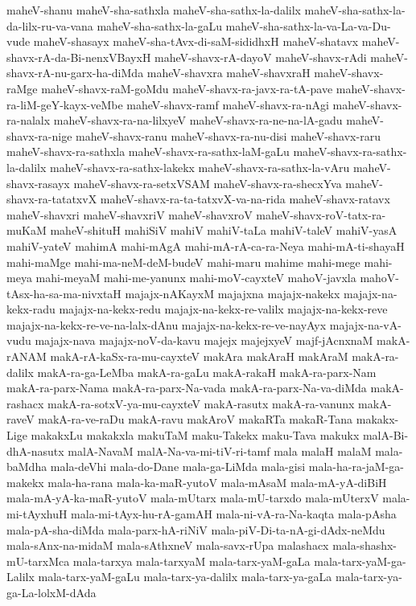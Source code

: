 {maheV-shanu
maheV-sha-sathxla
maheV-sha-sathx-la-dalilx
maheV-sha-sathx-la-da-lilx-ru-va-vana
maheV-sha-sathx-la-gaLu
maheV-sha-sathx-la-va-La-va-Du-vude
maheV-shasayx
maheV-sha-tAvx-di-saM-sididhxH
maheV-shatavx
maheV-shavx-rA-da-Bi-nenxVBayxH
maheV-shavx-rA-dayoV
maheV-shavx-rAdi
maheV-shavx-rA-nu-garx-ha-diMda
maheV-shavxra
maheV-shavxraH
maheV-shavx-raMge
maheV-shavx-raM-goMdu
maheV-shavx-ra-javx-ra-tA-pave
maheV-shavx-ra-liM-geY-kayx-veMbe
maheV-shavx-ramf
maheV-shavx-ra-nAgi
maheV-shavx-ra-nalalx
maheV-shavx-ra-na-lilxyeV
maheV-shavx-ra-ne-na-lA-gadu
maheV-shavx-ra-nige
maheV-shavx-ranu
maheV-shavx-ra-nu-disi
maheV-shavx-raru
maheV-shavx-ra-sathxla
maheV-shavx-ra-sathx-laM-gaLu
maheV-shavx-ra-sathx-la-dalilx
maheV-shavx-ra-sathx-lakekx
maheV-shavx-ra-sathx-la-vAru
maheV-shavx-rasayx
maheV-shavx-ra-setxVSAM
maheV-shavx-ra-shecxYva
maheV-shavx-ra-tatatxvX
maheV-shavx-ra-ta-tatxvX-va-na-rida
maheV-shavx-ratavx
maheV-shavxri
maheV-shavxriV
maheV-shavxroV
maheV-shavx-roV-tatx-ra-muKaM
maheV-shituH
mahiSiV
mahiV
mahiV-taLa
mahiV-taleV
mahiV-yasA
mahiV-yateV
mahimA
mahi-mAgA
mahi-mA-rA-ca-ra-Neya
mahi-mA-ti-shayaH
mahi-maMge
mahi-ma-neM-deM-budeV
mahi-maru
mahime
mahi-mege
mahi-meya
mahi-meyaM
mahi-me-yanunx
mahi-moV-cayxteV
mahoV-javxla
mahoV-tAsx-ha-sa-ma-nivxtaH
majajx-nAKayxM
majajxna
majajx-nakekx
majajx-na-kekx-radu
majajx-na-kekx-redu
majajx-na-kekx-re-valilx
majajx-na-kekx-reve
majajx-na-kekx-re-ve-na-lalx-dAnu
majajx-na-kekx-re-ve-nayAyx
majajx-na-vA-vudu
majajx-nava
majajx-noV-da-kavu
majejx
majejxyeV
majf-jAcnxnaM
makA-rANAM
makA-rA-kaSx-ra-mu-cayxteV
makAra
makAraH
makAraM
makA-ra-dalilx
makA-ra-ga-LeMba
makA-ra-gaLu
makA-rakaH
makA-ra-parx-Nam
makA-ra-parx-Nama
makA-ra-parx-Na-vada
makA-ra-parx-Na-va-diMda
makA-rashacx
makA-ra-sotxV-ya-mu-cayxteV
makA-rasutx
makA-ra-vanunx
makA-raveV
makA-ra-ve-raDu
makA-ravu
makAroV
makaRTa
makaR-Tana
makakx-Lige
makakxLu
makakxla
makuTaM
maku-Takekx
maku-Tava
makukx
malA-Bi-dhA-nasutx
malA-NavaM
malA-Na-va-mi-tiV-ri-tamf
mala
malaH
malaM
mala-baMdha
mala-deVhi
mala-do-Dane
mala-ga-LiMda
mala-gisi
mala-ha-ra-jaM-ga-makekx
mala-ha-rana
mala-ka-maR-yutoV
mala-mAsaM
mala-mA-yA-diBiH
mala-mA-yA-ka-maR-yutoV
mala-mUtarx
mala-mU-tarxdo
mala-mUterxV
mala-mi-tAyxhuH
mala-mi-tAyx-hu-rA-gamAH
mala-ni-vA-ra-Na-kaqta
mala-pAsha
mala-pA-sha-diMda
mala-parx-hA-riNiV
mala-piV-Di-ta-nA-gi-dAdx-neMdu
mala-sAnx-na-midaM
mala-sAthxneV
mala-savx-rUpa
malashacx
mala-shashx-mU-tarxMca
mala-tarxya
mala-tarxyaM
mala-tarx-yaM-gaLa
mala-tarx-yaM-ga-Lalilx
mala-tarx-yaM-gaLu
mala-tarx-ya-dalilx
mala-tarx-ya-gaLa
mala-tarx-ya-ga-La-lolxM-dAda
}

